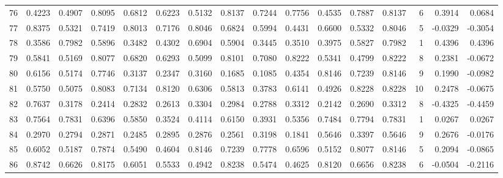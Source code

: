 \begin{tabular}{lrrrrrrrrrrrrrrr}
76  &      0.4223 &  0.4907 &  0.8095 &  0.6812 &  0.6223 &  0.5132 &  0.8137 &  0.7244 &  0.7756 &  0.4535 &   0.7887 &     0.8137 &      6 &                    0.3914 &                     0.0684 \\
77  &      0.8375 &  0.5321 &  0.7419 &  0.8013 &  0.7176 &  0.8046 &  0.6824 &  0.5994 &  0.4431 &  0.6600 &   0.5332 &     0.8046 &      5 &                   -0.0329 &                    -0.3054 \\
78  &      0.3586 &  0.7982 &  0.5896 &  0.3482 &  0.4302 &  0.6904 &  0.5904 &  0.3445 &  0.3510 &  0.3975 &   0.5827 &     0.7982 &      1 &                    0.4396 &                     0.4396 \\
79  &      0.5841 &  0.5169 &  0.8077 &  0.6820 &  0.6293 &  0.5099 &  0.8101 &  0.7080 &  0.8222 &  0.5341 &   0.4799 &     0.8222 &      8 &                    0.2381 &                    -0.0672 \\
80  &      0.6156 &  0.5174 &  0.7746 &  0.3137 &  0.2347 &  0.3160 &  0.1685 &  0.1085 &  0.4354 &  0.8146 &   0.7239 &     0.8146 &      9 &                    0.1990 &                    -0.0982 \\
81  &      0.5750 &  0.5075 &  0.8083 &  0.7134 &  0.8120 &  0.6306 &  0.5813 &  0.3783 &  0.6141 &  0.4926 &   0.8228 &     0.8228 &     10 &                    0.2478 &                    -0.0675 \\
82  &      0.7637 &  0.3178 &  0.2414 &  0.2832 &  0.2613 &  0.3304 &  0.2984 &  0.2788 &  0.3312 &  0.2142 &   0.2690 &     0.3312 &      8 &                   -0.4325 &                    -0.4459 \\
83  &      0.7564 &  0.7831 &  0.6396 &  0.5850 &  0.3524 &  0.4114 &  0.6150 &  0.3931 &  0.5356 &  0.7484 &   0.7794 &     0.7831 &      1 &                    0.0267 &                     0.0267 \\
84  &      0.2970 &  0.2794 &  0.2871 &  0.2485 &  0.2895 &  0.2876 &  0.2561 &  0.3198 &  0.1841 &  0.5646 &   0.3397 &     0.5646 &      9 &                    0.2676 &                    -0.0176 \\
85  &      0.6052 &  0.5187 &  0.7874 &  0.5490 &  0.4604 &  0.8146 &  0.7239 &  0.7778 &  0.6596 &  0.5152 &   0.8077 &     0.8146 &      5 &                    0.2094 &                    -0.0865 \\
86  &      0.8742 &  0.6626 &  0.8175 &  0.6051 &  0.5533 &  0.4942 &  0.8238 &  0.5474 &  0.4625 &  0.8120 &   0.6656 &     0.8238 &      6 &                   -0.0504 &                    -0.2116 \\

\end{tabular}
